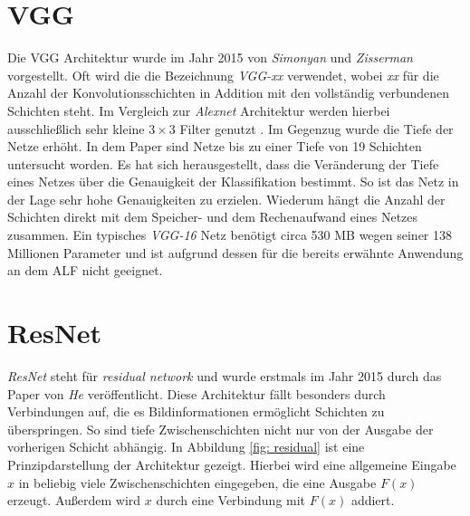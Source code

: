		\section*{VGG}
		\label{subsec: vgg}
		Die VGG Architektur wurde im Jahr 2015 von \textit{Simonyan} und \textit{Zisserman} \cite{vgg} vorgestellt. Oft wird die die Bezeichnung \textit{VGG-xx} verwendet, wobei \textit{xx} für die Anzahl der Konvolutionsschichten in Addition mit den vollständig verbundenen Schichten steht. Im Vergleich zur \textit{Alexnet} Architektur werden hierbei ausschließlich sehr kleine $3 \times 3$ Filter genutzt \cite{alexnet} \cite{vgg}. Im Gegenzug wurde die Tiefe der Netze erhöht. In dem Paper sind Netze bis zu einer Tiefe von 19 Schichten untersucht worden\cite{vgg}. Es hat sich herausgestellt, dass die Veränderung der Tiefe eines Netzes über die Genauigkeit der Klassifikation bestimmt. So ist das Netz in der Lage sehr hohe Genauigkeiten zu erzielen. Wiederum hängt die Anzahl der Schichten direkt mit dem Speicher- und dem Rechenaufwand eines Netzes zusammen. Ein typisches \textit{VGG-16} Netz benötigt circa 530 MB wegen seiner 138 Millionen Parameter und ist aufgrund dessen für die bereits erwähnte Anwendung an dem ALF nicht geeignet.\\
		
		\section*{ResNet}
		\label{subsec: resnet}
		\textit{ResNet} steht für \textit{residual network} und wurde erstmals im Jahr 2015 durch das Paper von \textit{He} veröffentlicht. Diese Architektur fällt besonders durch Verbindungen auf, die es Bildinformationen ermöglicht Schichten zu überspringen. So sind tiefe Zwischenschichten nicht nur von der Ausgabe der vorherigen Schicht abhängig. In Abbildung \ref{fig: residual} ist eine Prinzipdarstellung der Architektur gezeigt. Hierbei wird eine allgemeine Eingabe $x$ in beliebig viele Zwischenschichten eingegeben, die eine Ausgabe $F(x)$ erzeugt. Außerdem wird $x$ durch eine Verbindung mit $F(x)$ addiert.
		
